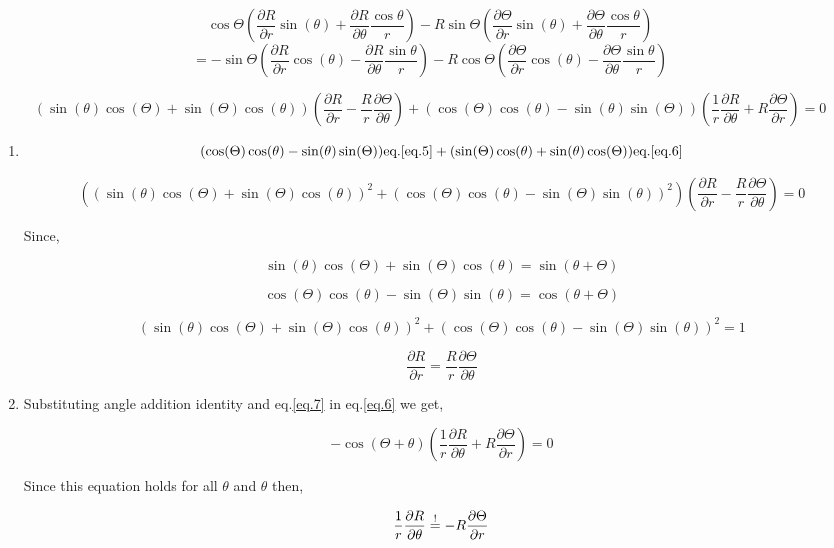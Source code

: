\documentclass[12pt]{article}
\begin{document}
\[
    \cos \Theta (\frac{\partial R}{\partial r}\sin(\theta) + \frac{\partial R}{\partial \theta}\frac{\cos \theta}{r})
    - R \sin \Theta (\frac{\partial \Theta}{\partial r}\sin(\theta) + \frac{\partial \Theta}{\partial \theta}\frac{\cos \theta}{r})
\]
\[
    = -\sin \Theta (\frac{\partial R}{\partial r}\cos(\theta) - \frac{\partial R}{\partial \theta}\frac{\sin \theta}{r})
    - R \cos \Theta (\frac{\partial \Theta}{\partial r}\cos(\theta) - \frac{\partial \Theta}{\partial \theta}\frac{\sin \theta}{r})
\]

\[
    (\sin(\theta)\cos(\Theta) + \sin(\Theta)\cos(\theta))
    (\frac{\partial R}{\partial r} - \frac{R}{r}\frac{\partial \Theta}{\partial \theta})
    + (\cos(\Theta)\cos(\theta) - \sin(\theta)\sin(\Theta))(\frac{1}{r}\frac{\partial R}{\partial \theta} + R\frac{\partial \Theta}{\partial r})
    = 0 \tag{6}\label{eq.6}
\]

\begin{enumerate}
    \item
          \[
              (\cos(\Theta)\cos(\theta) - \sin(\theta)\sin(\Theta))\text{eq.}\ref{eq.5}+(\sin(\Theta)\cos(\theta) + \sin(\theta)\cos(\Theta))\text{eq.}\ref{eq.6}
          \]

          \[
              ({(\sin(\theta)\cos(\Theta) + \sin(\Theta)\cos(\theta))}^2 + {(\cos(\Theta)\cos(\theta) - \sin(\Theta)\sin(\theta))}^2)
              (\frac{\partial R}{\partial r} - \frac{R}{r}\frac{\partial \Theta}{\partial \theta})
              = 0
          \]

          Since,

          \[
              \sin(\theta)\cos(\Theta) + \sin(\Theta)\cos(\theta) = \sin(\theta + \Theta)
          \]

          \[
              \cos(\Theta)\cos(\theta) - \sin(\Theta)\sin(\theta) = \cos(\theta + \Theta)
          \]

          \[
              {(\sin(\theta)\cos(\Theta) + \sin(\Theta)\cos(\theta))}^2 + {(\cos(\Theta)\cos(\theta) - \sin(\Theta)\sin(\theta))}^2 = 1
          \]

          \[
              \frac{\partial R}{\partial r} = \frac{R}{r}\frac{\partial \Theta}{\partial \theta}\tag{7}\label{eq.7}
          \]
    \item
          Substituting angle addition identity and eq.\ref{eq.7} in eq.\ref{eq.6} we get,

          \[
              -\cos(\Theta + \theta)(\frac{1}{r}\frac{\partial R}{\partial \theta} + R\frac{\partial \Theta}{\partial r}) = 0
          \]

          Since this equation holds for all $\theta$ and $\theta$ then,

          \[
              \frac{1}{r}\frac{\partial R}{\partial \theta} \overset{!}{=} - R\frac{\partial \Theta}{\partial r}
          \]

\end{enumerate}
\end{document}
